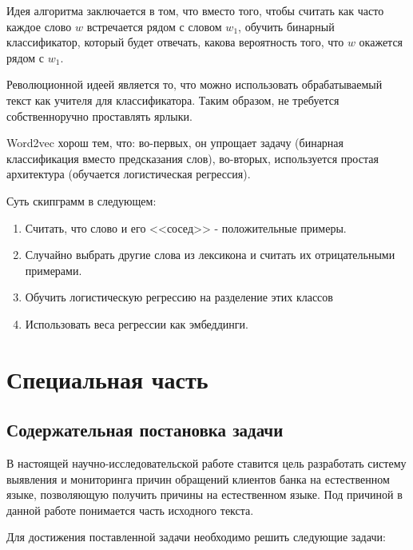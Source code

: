 \documentclass[a4paper,12pt,preview]{report} %
\begin{document}
	Идея алгоритма заключается в том, что вместо того, чтобы считать как часто каждое слово $w$ встречается рядом с словом $w_1$, обучить бинарный классификатор, который будет отвечать, какова вероятность того, что $w$ окажется рядом с $w_1$.
	
	Революционной идеей является то, что можно использовать обрабатываемый текст как учителя для классификатора. Таким образом, не требуется собственноручно проставлять ярлыки.
	
	Word2vec \cite{20} хорош тем, что: во-первых, он упрощает задачу (бинарная классификация вместо предсказания слов), во-вторых, используется простая архитектура (обучается логистическая регрессия).
	
	Суть скипграмм в следующем:
	
	\begin{enumerate}
		\item Считать, что слово и его <<сосед>> - положительные примеры.
		\item Случайно выбрать другие слова из лексикона и считать их отрицательными примерами.
		\item Обучить логистическую регрессию на разделение этих классов
		\item Использовать веса регрессии как эмбеддинги. 
	\end{enumerate}
	
	
	
	
	\chapter{Специальная часть}
	
	
	
	
	\section{Содержательная постановка задачи}
	
	В настоящей научно-исследовательской работе ставится цель разработать систему выявления и мониторинга причин обращений клиентов банка на естественном языке, позволяющую получить причины на естественном языке. Под причиной в данной работе понимается часть исходного текста.
	
	Для достижения поставленной задачи необходимо решить следующие задачи:
	
\end{document}
